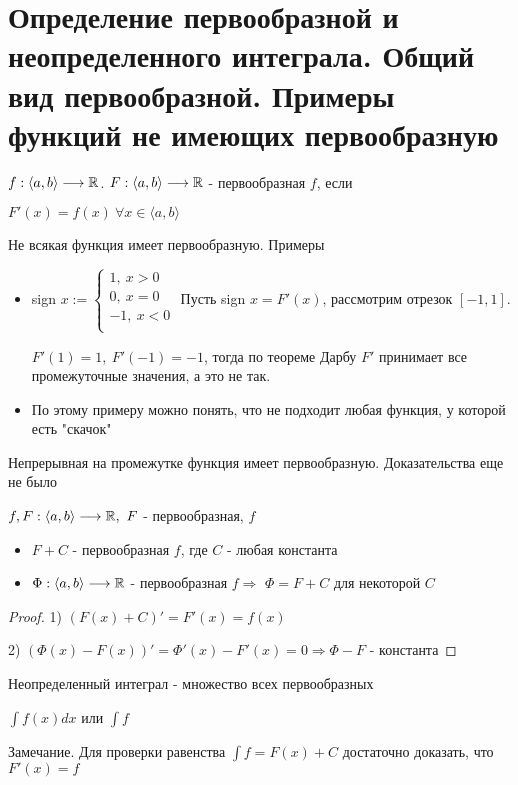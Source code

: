 \section{Определение первообразной и неопределенного интеграла. Общий вид первообразной. Примеры функций не имеющих первообразную \href{https://youtu.be/p9C57KDo1Yg?t=3244}{\Walley}}

\begin{conj}
    $f: \langle a, b \rangle \longrightarrow \mathbb{R}$. $F: \langle a, b \rangle \longrightarrow \mathbb{R}$ - первообразная $f$, если

    $F'(x) = f(x)\ \forall x\in \langle a, b \rangle$
\end{conj}

Не всякая функция имеет первообразную. Примеры
\begin{itemize}
    \item sign $x:= \begin{cases}
        1,\ x > 0\\
        0,\ x = 0\\
        -1,\ x < 0\\
    \end{cases}$
    Пусть sign $x = F'(x)$, рассмотрим отрезок $[-1, 1]$.

    $F'(1) = 1,\ F'(-1) = -1$, тогда по теореме Дарбу $F'$ принимает все промежуточные значения, а это не так.

    \item По этому примеру можно понять, что не подходит любая функция, у которой есть "скачок"
\end{itemize}

\begin{theorem-non}
    Непрерывная на промежутке функция имеет первообразную. Доказательства еще не было
\end{theorem-non}

\begin{theorem-non}
    $f, F: \langle a, b \rangle \longrightarrow \mathbb{R},\ F$ - первообразная, $f$
    \begin{itemize}
        \item $F + C$ - первообразная $f$, где $C$ - любая константа
        \item $\Phi: \langle a, b \rangle \longrightarrow \mathbb{R}$ - первообразная $f \Rightarrow$ $\Phi = F+C$ для некоторой $C$
    \end{itemize}
\end{theorem-non}

\begin{proof}
    1) $(F(x)+C)' = F'(x) = f(x)$
    
    2) $(\Phi(x)-F(x))' = \Phi'(x) - F'(x) = 0 \Rightarrow \Phi - F$ - константа
\end{proof}

\begin{conj}
    Неопределенный интеграл - множество всех первообразных

    $\int f(x) dx$ или $\int f$
\end{conj}

Замечание. Для проверки равенства $\int f = F(x) + C$ достаточно доказать, что $F'(x) = f$